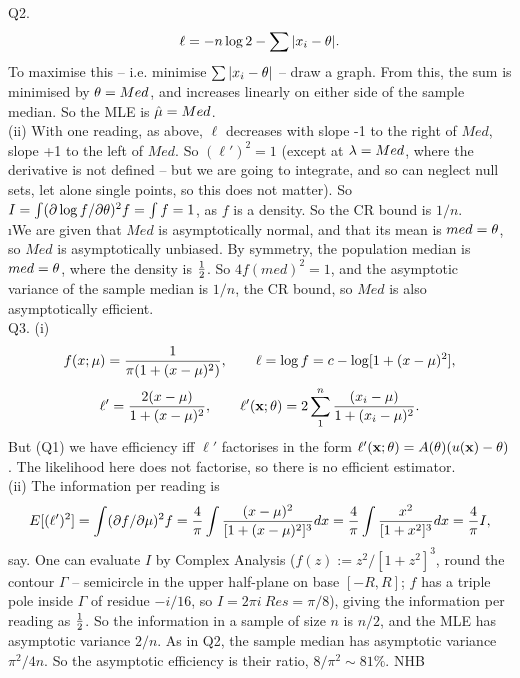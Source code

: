 \documentclass[12pt]{article}
\begin{document}
\ni Q2.
$$
\ell = -n \log 2 - \sum |x_i - \theta|.
$$
To maximise this -- i.e. minimise $\sum |x_i - \theta|$ -- draw a graph.  From this, the sum is minimised by $\theta = Med$, and increases linearly on either side of the sample median.  So the MLE is
$\hat{\mu} = Med$. \\
(ii) With one reading, as above, $\ell$ decreases with slope -1 to the right of $Med$, slope +1 to the left of $Med$.  So $({\ell}')^2 = 1$ (except at $\lambda = Med$, where the derivative is not defined -- but we are going to integrate, and so can neglect null sets, let alone single points, so this does not matter).  So $I = \int (\partial \log f/\partial \theta)^2 f = \int f = 1$, as $f$ is a
density.  So the CR bound is $1/n$. \\
\i  We are given that $Med$ is asymptotically normal, and that its mean is $med = \theta$, so $Med$ is asymptotically unbiased. By symmetry, the population median is $med = \theta$, where the density is $\frac{1}{2}$.  So $4 f(med)^2 = 1$, and the asymptotic variance of the sample median is $1/n$, the CR bound, so $Med$ is also asymptotically efficient.\\

\ni Q3. (i)
$$
f(x; \mu) = \frac{1}{\pi(1 + (x - \mu)^2)}, \qquad \ell = \log f = c - \log[1 + (x - \mu)^2],
$$
$$
{\ell}' = \frac{2(x - \mu)}{1 + (x - \mu)^2}, \qquad {\ell}'({\bf x}; \theta) = 2 \sum_1^n \frac{(x_i - \mu)}{1 + (x_i - \mu)^2}.
$$
But (Q1) we have efficiency iff ${\ell}'$ factorises in the form ${\ell}'({\bf x}; \theta) = A(\theta) (u({\bf x}) - \theta)$.  The likelihood here does not factorise, so there is no efficient estimator. \\
(ii) The information per reading is
$$
E[({\ell}')^2] = \int (\partial f/\partial \mu)^2 f
= \frac{4}{\pi} \int \frac{(x - \mu)^2}{[1 + (x - \mu)^2]^3} dx
= \frac{4}{\pi} \int \frac{x^2}{[1 + x^2]^3} dx = \frac{4}{\pi} I,
$$
say.  One can evaluate $I$ by Complex Analysis ($f(z) := z^2/[1 + z^2]^3$, round the contour $\Gamma$ -- semicircle in the upper half-plane on base $[-R,R]$; $f$ has a triple pole inside $\Gamma$ of residue $-i/16$, so $I = 2 \pi i \ Res = \pi/8$), giving the information per reading as $\frac{1}{2}$.  So the information in a sample of size $n$ is $n/2$, and the MLE has asymptotic variance $2/n$.  As in Q2, the sample median has asymptotic variance ${\pi}^2/4n$.  So the asymptotic efficiency is their ratio, $8/{\pi}^2 \sim 81 \%$.  \hfil NHB \break
\end{document}
